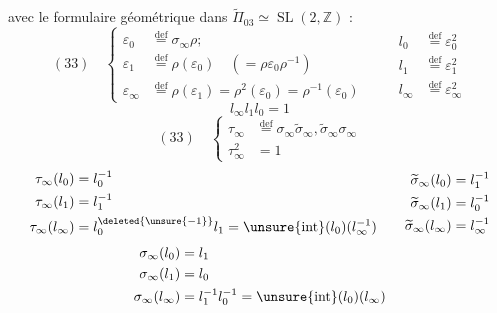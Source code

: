 avec le formulaire géométrique dans $\widetilde\Pi_{03}\simeq\operatorname{SL}(2,\mathbb Z)$ :
\[
(33)\quad\left\{\begin{aligned}
\varepsilon_0&\overset{\mathrm{def}}=\sigma_\infty\rho;\\
\varepsilon_1&\overset{\mathrm{def}}=\rho(\varepsilon_0)\quad(=\rho\varepsilon_0\rho^{-1})\\
\varepsilon_\infty&\overset{\mathrm{def}}=\rho(\varepsilon_1)=\rho^2(\varepsilon_0)=\rho^{-1}(\varepsilon_0)
\end{aligned}\right.
\qquad
\begin{aligned}
l_0&\overset{\mathrm{def}}=\varepsilon_0^2\\
l_1&\overset{\mathrm{def}}=\varepsilon_1^2\\
l_\infty&\overset{\mathrm{def}}=\varepsilon_\infty^2
\end{aligned}
\]
\[
l_\infty l_1l_0=1
\]
\[
(33)\quad\left\{\begin{aligned}
\tau_\infty&\overset{\mathrm{def}}=\sigma_\infty\widetilde\sigma_\infty,\widetilde\sigma_\infty\sigma_\infty\\
\tau_\infty^2&=1
\end{aligned}\right.
\]
\[
\begin{aligned}
\tau_\infty(l_0)&=l_0^{-1}\\
\tau_\infty(l_1)&=l_1^{-1}\\
\tau_\infty(l_\infty)&=l_0^{\deleted{\unsure{-1}}}l_1=\unsure{\operatorname{int}}(l_0)(l_\infty^{-1})
\end{aligned}
\qquad
\begin{aligned}
\widetilde\sigma_\infty(l_0)&=l_1^{-1}\\
\widetilde\sigma_\infty(l_1)&=l_0^{-1}\\
\widetilde\sigma_\infty(l_\infty)&=l_\infty^{-1}
\end{aligned}
\]
\[
\begin{aligned}
\sigma_\infty(l_0)&=l_1\\
\sigma_\infty(l_1)&=l_0\\
\sigma_\infty(l_\infty)&=l_1^{-1}l_0^{-1}=\unsure{\operatorname{int}}(l_0)(l_\infty)
\end{aligned}
\]

